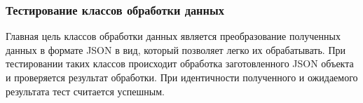 \subsubsection{Тестирование классов обработки данных}

Главная цель классов обработки данных является преобразование полученных данных в формате JSON в вид, который позволяет легко их обрабатывать.
При тестировании таких классов происходит обработка заготовленного JSON объекта и проверяется результат обработки.
При идентичности полученного и ожидаемого результата тест считается успешным.
